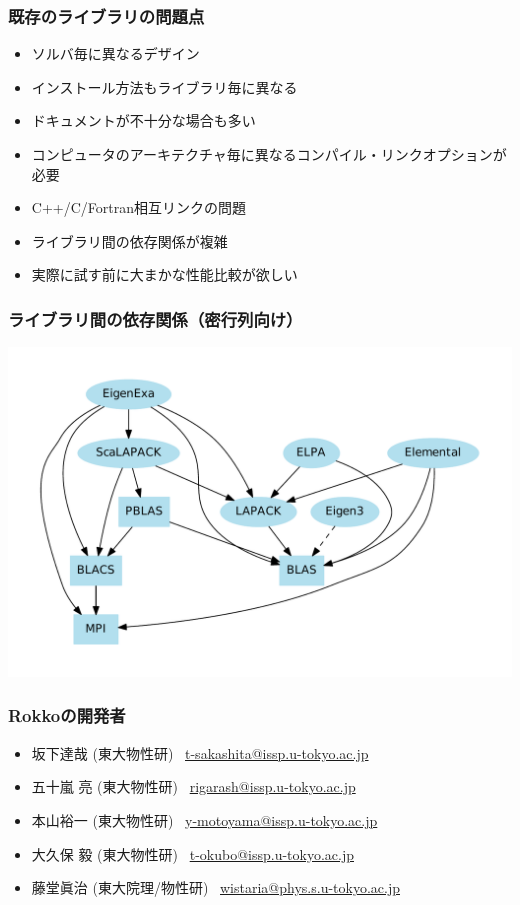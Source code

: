 \begin{frame}
  \frametitle{既存のライブラリの問題点}
  \begin{itemize}
    \setlength{\itemsep}{1em}
  \item ソルバ毎に異なるデザイン
  \item インストール方法もライブラリ毎に異なる
  \item ドキュメントが不十分な場合も多い
  \item コンピュータのアーキテクチャ毎に異なるコンパイル・リンクオプションが必要
  \item C++/C/Fortran相互リンクの問題
  \item ライブラリ間の依存関係が複雑
  \item 実際に試す前に大まかな性能比較が欲しい
  \end{itemize}
\end{frame}

\begin{frame}
  \frametitle{ライブラリ間の依存関係（密行列向け）}
  \begin{center}
    \includegraphics[height=0.8\textheight]{figure/eigensolver_dependency.pdf}
  \end{center}
\end{frame}

\begin{frame}
  \frametitle{Rokkoの開発者}
  \begin{itemize}
    \setlength{\itemsep}{1em}
  \item 坂下達哉 (東大物性研) \ \href{mailto:t-sakashita@issp.u-tokyo.ac.jp}{t-sakashita@issp.u-tokyo.ac.jp}
  \item 五十嵐 亮 (東大物性研) \ \href{mailto:rigarash@issp.u-tokyo.ac.jp}{rigarash@issp.u-tokyo.ac.jp}
  \item 本山裕一 (東大物性研) \ \href{mailto:y-motoyama@issp.u-tokyo.ac.jp}{y-motoyama@issp.u-tokyo.ac.jp}
  \item 大久保 毅 (東大物性研) \ \href{mailto:t-okubo@issp.u-tokyo.ac.jp}{t-okubo@issp.u-tokyo.ac.jp}
  \item 藤堂眞治 (東大院理/物性研) \ \href{mailto:wistaria@phys.s.u-tokyo.ac.jp}{wistaria@phys.s.u-tokyo.ac.jp}
  \end{itemize}
\end{frame}

